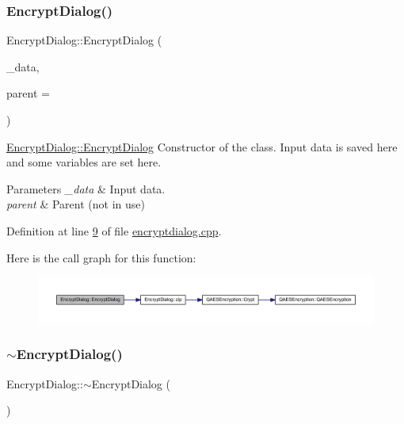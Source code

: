 \subsubsection{\texorpdfstring{Encrypt\+Dialog()}{EncryptDialog()}}
{\footnotesize\ttfamily Encrypt\+Dialog\+::\+Encrypt\+Dialog (\begin{DoxyParamCaption}\item[{Q\+Byte\+Array}]{\+\_\+data,  }\item[{Q\+Widget $\ast$}]{parent = {} }\end{DoxyParamCaption})\hspace{0.3cm}{\ttfamily [explicit]}}



\mbox{\hyperlink{class_encrypt_dialog_ab57e8b3a0d00c977e81f3b356657524e}{Encrypt\+Dialog\+::\+Encrypt\+Dialog}} Constructor of the class. Input data is saved here and some variables are set here. 


\begin{DoxyParams}{Parameters}
{\em \+\_\+data} & Input data. \\
\hline
{\em parent} & Parent (not in use) \\
\hline
\end{DoxyParams}


Definition at line \mbox{\hyperlink{encryptdialog_8cpp_source_l00009}{9}} of file \mbox{\hyperlink{encryptdialog_8cpp_source}{encryptdialog.\+cpp}}.

Here is the call graph for this function\+:
\nopagebreak
\begin{figure}[H]
\begin{center}
\leavevmode
\includegraphics[width=350pt]{class_encrypt_dialog_ab57e8b3a0d00c977e81f3b356657524e_cgraph}
\end{center}
\end{figure}
\mbox{\label{class_encrypt_dialog_a466e283080f87ee50f172052e43e38b6}} 
\subsubsection{\texorpdfstring{$\sim$\+Encrypt\+Dialog()}{~EncryptDialog()}}
{\footnotesize\ttfamily Encrypt\+Dialog\+::$\sim$\+Encrypt\+Dialog (\begin{DoxyParamCaption}{ }\end{DoxyParamCaption})}



